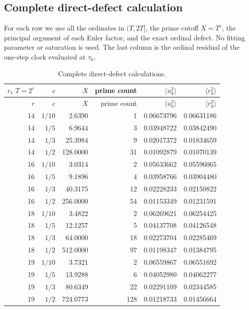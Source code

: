 \documentclass[11pt,reqno]{amsart}
\numberwithin{equation}{section}
\theoremstyle{plain}
\theoremstyle{definition}
\theoremstyle{remark}
\begin{document}
\subsection{Complete direct-defect calculation}
For each row we use all the ordinates in $(T,2T]$, the prime cutoff $X=T^c$, the principal argument of each Euler factor, and the exact ordinal defect. No fitting parameter or saturation is used. The last column is the ordinal residual of the one-step clock evaluated at $\tau_k$.
\begin{center}\small
\begin{longtable}{rrrrrr}
\caption{Complete direct-defect calculations.}\label{tab:direct_complete}\\
\toprule
$r$, $T=2^r$ & $c$ & $X$ & prime count & $\langle u_k^2\rangle$ & $\langle r_k^2\rangle$\\
\midrule\endfirsthead
\toprule
$r$ & $c$ & $X$ & prime count & $\langle u_k^2\rangle$ & $\langle r_k^2\rangle$\\
\midrule\endhead
14 & $1/10$ & 2.6390 & 1 & 0.06673796 & 0.06631186\\
14 & $1/5$ & 6.9644 & 3 & 0.03948722 & 0.03842490\\
14 & $1/3$ & 25.3984 & 9 & 0.02017372 & 0.01834659\\
14 & $1/2$ & 128.0000 & 31 & 0.01092879 & 0.01070139\\
16 & $1/10$ & 3.0314 & 2 & 0.05633662 & 0.05596065\\
16 & $1/5$ & 9.1896 & 4 & 0.03958766 & 0.03904480\\
16 & $1/3$ & 40.3175 & 12 & 0.02228233 & 0.02150822\\
16 & $1/2$ & 256.0000 & 54 & 0.01153349 & 0.01231591\\
18 & $1/10$ & 3.4822 & 2 & 0.06269621 & 0.06254425\\
18 & $1/5$ & 12.1257 & 5 & 0.04137708 & 0.04126548\\
18 & $1/3$ & 64.0000 & 18 & 0.02273704 & 0.02285469\\
18 & $1/2$ & 512.0000 & 97 & 0.01198347 & 0.01384795\\
19 & $1/10$ & 3.7321 & 2 & 0.06559867 & 0.06551692\\
19 & $1/5$ & 13.9288 & 6 & 0.04052980 & 0.04062277\\
19 & $1/3$ & 80.6349 & 22 & 0.02291109 & 0.02344585\\
19 & $1/2$ & 724.0773 & 128 & 0.01218733 & 0.01456664\\
\bottomrule
\end{longtable}\end{center}
\end{document}
